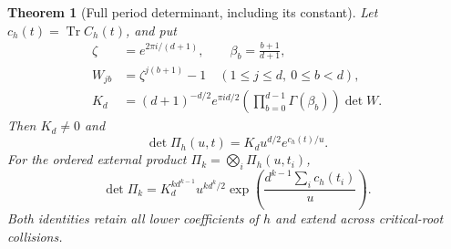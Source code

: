 \documentclass[11pt]{article}
\newtheorem{theorem}{Theorem}
\DeclareMathOperator{\Tr}{Tr}
\begin{document}
\begin{theorem}[Full period determinant, including its constant]
Let $c_h(t)=\Tr C_h(t)$, and put
\begin{align}
 \zeta&=e^{2\pi i/(d+1)},\qquad \beta_b=\frac{b+1}{d+1},
       \nonumber\\
 W_{jb}&=\zeta^{j(b+1)}-1
       \quad(1\le j\le d,\ 0\le b<d),\nonumber\\
 K_d&=(d+1)^{-d/2}e^{\pi i d/2}
           \left(\prod_{b=0}^{d-1}\Gamma(\beta_b)\right)\det W.
       \label{eq:constant}
\end{align}
Then $K_d\ne0$ and
\begin{equation}
 \boxed{\det\Pi_h(u,t)=K_d u^{d/2}e^{c_h(t)/u}.}
 \label{eq:det-one}
\end{equation}
For the ordered external product $\Pi_k=\bigotimes_i\Pi_h(u,t_i)$,
\begin{equation}
 \boxed{\det\Pi_k
   =K_d^{k d^{k-1}}u^{k d^k/2}
         \exp\!\left(\frac{d^{k-1}\sum_i c_h(t_i)}u\right).}
 \label{eq:det-all}
\end{equation}
Both identities retain all lower coefficients of $h$ and extend across
critical-root collisions.
\end{theorem}
\end{document}
